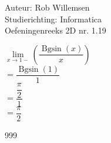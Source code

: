 \documentclass[a4paper]{article}
\newcommand{\Bgsin}{\operatorname{Bgsin}}
\begin{document}
\noindent \large Auteur: Rob Willemsen \\
\noindent \large Studierichting: Informatica\\
\noindent \large Oefeningenreeks 2D nr. 1.19\\

\medskip

\normalsize

$\lim\limits_{x \rightarrow 1-} \left(\dfrac{\Bgsin(x)}{x}\right)$ \\ 

$= \dfrac{\Bgsin(1)}{1}$ \\

$= \dfrac{\dfrac{\pi}{2}}{1}$ \\

$= \dfrac{\pi}{2}$ \\

\begin{thebibliography}{999}
\end{thebibliography}
\end{document}

